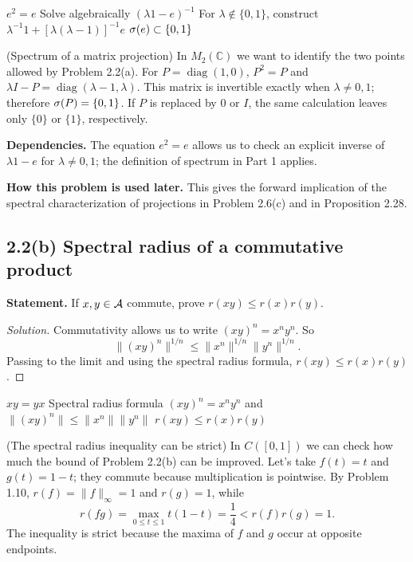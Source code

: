 \pagebreak
\proofdiagram
{$e^2=e$}
{Solve algebraically $(\lambda1-e)^{-1}$}
{For $\lambda\notin\{0,1\}$, construct $\lambda^{-1}1+[\lambda(\lambda-1)]^{-1}e$}
{$\sigma(e)\subset\{0,1\}$}

\begin{cthejemplo}{(Spectrum of a matrix projection)}
In $M_2(\mathbb C)$ we want to identify the two points allowed by Problem 2.2(a).
For $P=\operatorname{diag}(1,0)$, $P^2=P$ and
$\lambda I-P=\operatorname{diag}(\lambda-1,\lambda)$.
This matrix is invertible exactly when $\lambda\ne0,1$; therefore
$\sigma(P)=\{0,1\}$. If $P$ is replaced by $0$ or $I$, the same calculation leaves only
$\{0\}$ or $\{1\}$, respectively.
\end{cthejemplo}

\noindent\textbf{Dependencies.} The equation $e^2=e$ allows us to check an explicit inverse of $\lambda1-e$ for $\lambda\ne0,1$; the definition of spectrum in Part 1 applies.

\noindent\textbf{How this problem is used later.} This gives the forward implication of the spectral characterization of projections in Problem 2.6(c) and in Proposition 2.28.

\subsection*{2.2(b) Spectral radius of a commutative product}

\noindent\textbf{Statement.} If $x,y\in\mathcal A$ commute, prove $r(xy)\le r(x)r(y)$.

\begin{proof}[Solution]
Commutativity allows us to write $(xy)^n=x^ny^n$. So
\[
\|(xy)^n\|^{1/n}
\le\|x^n\|^{1/n}\|y^n\|^{1/n}.
\]
Passing to the limit and using the spectral radius formula,
$r(xy)\le r(x)r(y)$.
\end{proof}

\proofdiagram
{$xy=yx$}
{Spectral radius formula}
{$(xy)^n=x^ny^n$ and $\|(xy)^n\|\le\|x^n\|\|y^n\|$}
{$r(xy)\le r(x)r(y)$}

\begin{cthejemplo}{(The spectral radius inequality can be strict)}
In $C([0,1])$ we can check how much the bound of Problem 2.2(b) can be improved.
Let's take $f(t)=t$ and $g(t)=1-t$; they commute because multiplication is pointwise.
By Problem 1.10, $r(f)=\|f\|_\infty=1$ and $r(g)=1$, while
\[
 r(fg)=\max_{0\le t\le1}t(1-t)=\frac14<r(f)r(g)=1.
\]
The inequality is strict because the maxima of $f$ and $g$ occur at opposite endpoints.
\end{cthejemplo}

